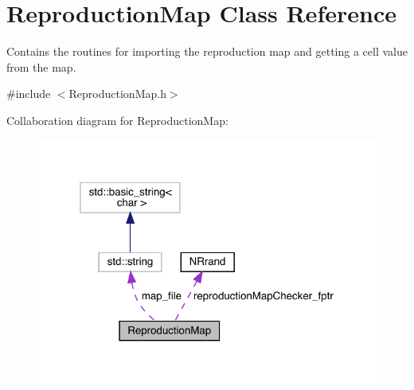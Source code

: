 \hypertarget{class_reproduction_map}{}\section{Reproduction\+Map Class Reference}
\label{class_reproduction_map}


Contains the routines for importing the reproduction map and getting a cell value from the map.  




{\ttfamily \#include $<$Reproduction\+Map.\+h$>$}



Collaboration diagram for Reproduction\+Map\+:\nopagebreak
\begin{figure}[H]
\begin{center}
\leavevmode
\includegraphics[width=319pt]{class_reproduction_map__coll__graph}
\end{center}
\end{figure}
